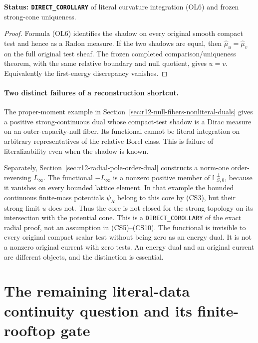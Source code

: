 \documentclass[11pt,a4paper]{article}
\numberwithin{equation}{section}
\theoremstyle{definition}
\theoremstyle{remark}
\begin{document}
\noindent\textbf{Status: \texttt{DIRECT\_COROLLARY}} of literal
curvature integration (OL6) and frozen strong-cone uniqueness.

\begin{proof}
Formula (OL6) identifies the shadow on every original smooth
compact test and hence as a Radon measure. If the two shadows
are equal, then $\widehat\mu_u=\widehat\mu_v$ on the full
original test sheaf. The frozen completed comparison/uniqueness
theorem, with the same relative boundary and null quotient,
gives $u=v$. Equivalently the first-energy discrepancy vanishes.
\end{proof}

\paragraph{Two distinct failures of a reconstruction shortcut.}
The proper-moment example in
Section~\ref{sec:r12-null-fibers-nonliteral-duals} gives a positive
strong-continuous dual whose compact-test shadow is a Dirac
measure on an outer-capacity-null fiber. Its functional cannot
be literal integration on arbitrary representatives of the
relative Borel class. This is failure of literalizability even
when the shadow is known.

Separately, Section~\ref{sec:r12-radial-pole-order-dual} constructs
a norm-one order-reversing $L_\infty$. The functional
$-L_\infty$ is a nonzero positive member of
$\mathbb L_{S,0}^{\perp}$, because it vanishes on every
bounded lattice element. In that example the bounded continuous
finite-mass potentials $\psi_R$ belong to this core by (CS3),
but their strong limit $u$ does not. Thus the core is not closed
for the strong topology on its intersection with the potential
cone. This is a \texttt{DIRECT\_COROLLARY} of the exact
radial proof, not an assumption in (CS5)--(CS10).
The functional is invisible to every original compact scalar
test without being zero as an energy dual. It is not a nonzero
original current with zero tests. An energy dual and an original
current are different objects, and the distinction is essential.




\section{The remaining literal-data continuity question and its finite-rooftop gate}
\label{sec:r12-literal-dual-rooftop-gate}
\end{document}
